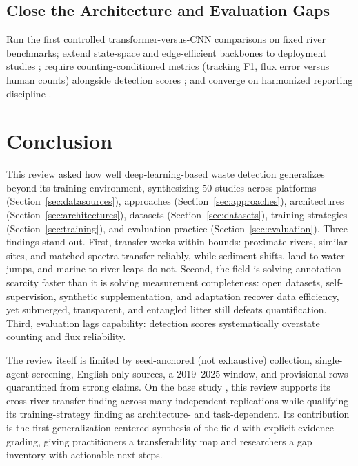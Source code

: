 \documentclass[12pt]{article}
\begin{document}
\subsection{Close the Architecture and Evaluation Gaps}
Run the first controlled transformer-versus-CNN comparisons on fixed river benchmarks; extend state-space and edge-efficient backbones to deployment studies \cite{Sun2025,Yan2025}; require counting-conditioned metrics (tracking F1, flux error versus human counts) alongside detection scores \cite{Lee2025,JiaFlux2025}; and converge on harmonized reporting discipline \cite{Hurley2023}.

\section{Conclusion}
\label{sec:conclusion}

This review asked how well deep-learning-based waste detection generalizes beyond its training environment, synthesizing 50 studies across platforms (Section~\ref{sec:datasources}), approaches (Section~\ref{sec:approaches}), architectures (Section~\ref{sec:architectures}), datasets (Section~\ref{sec:datasets}), training strategies (Section~\ref{sec:training}), and evaluation practice (Section~\ref{sec:evaluation}). Three findings stand out. First, transfer works within bounds: proximate rivers, similar sites, and matched spectra transfer reliably, while sediment shifts, land-to-water jumps, and marine-to-river leaps do not. Second, the field is solving annotation scarcity faster than it is solving measurement completeness: open datasets, self-supervision, synthetic supplementation, and adaptation recover data efficiency, yet submerged, transparent, and entangled litter still defeats quantification. Third, evaluation lags capability: detection scores systematically overstate counting and flux reliability.

The review itself is limited by seed-anchored (not exhaustive) collection, single-agent screening, English-only sources, a 2019--2025 window, and provisional rows quarantined from strong claims. On the base study \cite{Pati2025}, this review supports its cross-river transfer finding across many independent replications while qualifying its training-strategy finding as architecture- and task-dependent. Its contribution is the first generalization-centered synthesis of the field with explicit evidence grading, giving practitioners a transferability map and researchers a gap inventory with actionable next steps.



\end{document}
